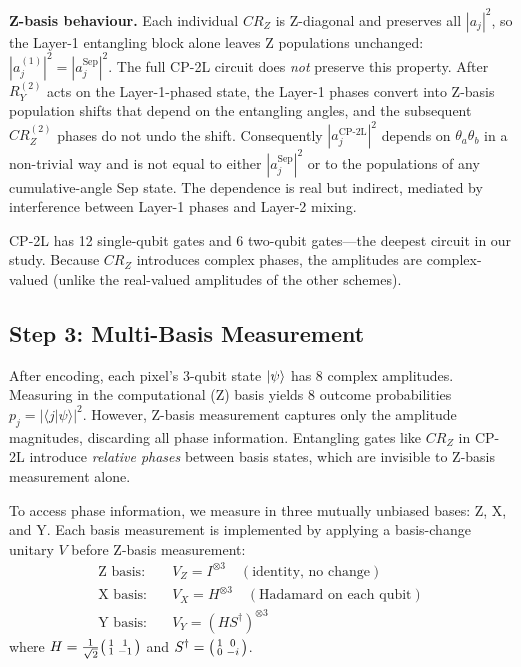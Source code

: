 \documentclass[conference,compsoc]{IEEEtran}
\begin{document}
\textbf{Z-basis behaviour.} Each individual $CR_Z$ is Z-diagonal and preserves all $|a_j|^2$, so the Layer-1 entangling block alone leaves Z populations unchanged: $|a^{(1)}_j|^2 = |a^\text{Sep}_j|^2$. The full CP-2L circuit does \emph{not} preserve this property. After $R_Y^{(2)}$ acts on the Layer-1-phased state, the Layer-1 phases convert into Z-basis population shifts that depend on the entangling angles, and the subsequent $CR_Z^{(2)}$ phases do not undo the shift. Consequently $|a^\text{CP-2L}_j|^2$ depends on $\theta_a\theta_b$ in a non-trivial way and is not equal to either $|a^\text{Sep}_j|^2$ or to the populations of any cumulative-angle Sep state. The dependence is real but indirect, mediated by interference between Layer-1 phases and Layer-2 mixing.

CP-2L has 12 single-qubit gates and 6 two-qubit gates---the deepest circuit in our study.
Because $CR_Z$ introduces complex phases, the amplitudes are complex-valued (unlike the real-valued amplitudes of the other schemes).

\subsection{Step 3: Multi-Basis Measurement}
\label{sec:multibasis}

After encoding, each pixel's 3-qubit state $\ket{\psi}$ has 8 complex amplitudes.
Measuring in the computational (Z) basis yields 8 outcome probabilities $p_j = |\langle j | \psi \rangle|^2$.
However, Z-basis measurement captures only the amplitude magnitudes, discarding all phase information.
Entangling gates like $CR_Z$ in CP-2L introduce \emph{relative phases} between basis states, which are invisible to Z-basis measurement alone.

To access phase information, we measure in three mutually unbiased bases: Z, X, and Y.
Each basis measurement is implemented by applying a basis-change unitary $V$ before Z-basis measurement:
\begin{align}
    \text{Z basis:} \quad & V_Z = I^{\otimes 3} \quad (\text{identity, no change}) \\
    \text{X basis:} \quad & V_X = H^{\otimes 3} \quad (\text{Hadamard on each qubit}) \\
    \text{Y basis:} \quad & V_Y = (HS^\dagger)^{\otimes 3}
    \label{eq:basis_change}
\end{align}
where $H = \frac{1}{\sqrt{2}}\begin{psmallmatrix} 1 & 1 \\ 1 & -1 \end{psmallmatrix}$ and $S^\dagger = \begin{psmallmatrix} 1 & 0 \\ 0 & -i \end{psmallmatrix}$.
\end{document}
